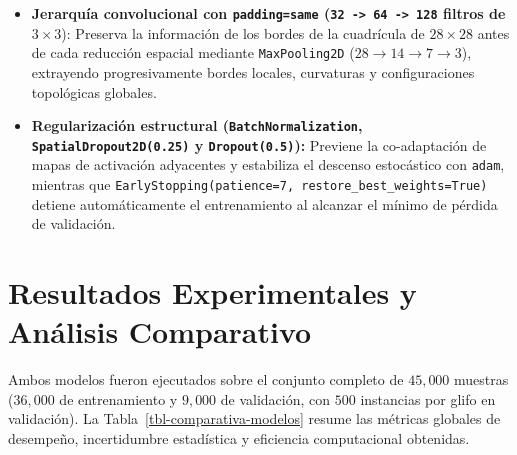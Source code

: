 \documentclass[
  spanish,
  us-letterpaper,
]{scrreprt}
\providecommand{\tightlist}{%
  \setlength{\itemsep}{0pt}\setlength{\parskip}{0pt}}
\theoremstyle{definition}
\theoremstyle{remark}
\begin{document}
\begin{itemize}
\tightlist
\item
  \textbf{Jerarquía convolucional con
  \texttt{padding=\textquotesingle{}same\textquotesingle{}}
  (\texttt{32\ -\textgreater{}\ 64\ -\textgreater{}\ 128} filtros de}
  \(3 \times 3\)): Preserva la información de los bordes de la
  cuadrícula de \(28 \times 28\) antes de cada reducción espacial
  mediante \texttt{MaxPooling2D} (\(28 \to 14 \to 7 \to 3\)), extrayendo
  progresivamente bordes locales, curvaturas y configuraciones
  topológicas globales.
\item
  \textbf{Regularización estructural (\texttt{BatchNormalization},
  \texttt{SpatialDropout2D(0.25)} y \texttt{Dropout(0.5)}):} Previene la
  co-adaptación de mapas de activación adyacentes y estabiliza el
  descenso estocástico con \texttt{adam}, mientras que
  \texttt{EarlyStopping(patience=7,\ restore\_best\_weights=True)}
  detiene automáticamente el entrenamiento al alcanzar el mínimo de
  pérdida de validación.
\end{itemize}

\section{Resultados Experimentales y Análisis
Comparativo}\label{resultados-experimentales-y-anuxe1lisis-comparativo}

Ambos modelos fueron ejecutados sobre el conjunto completo de
\(45{,}000\) muestras (\(36{,}000\) de entrenamiento y \(9{,}000\) de
validación, con \(500\) instancias por glifo en validación). La
Tabla~\ref{tbl-comparativa-modelos} resume las métricas globales de
desempeño, incertidumbre estadística y eficiencia computacional
obtenidas.
\end{document}
